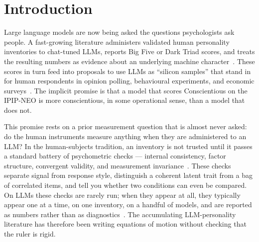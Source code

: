 
\section{Introduction}
\label{sec:intro}

Large language models are now being asked the questions psychologists ask people. A fast-growing literature administers validated human personality inventories to chat-tuned LLMs, reports Big Five or Dark Triad scores, and treats the resulting numbers as evidence about an underlying machine character~\citep{miotto2023gpt3,serapio2025psychometric,jiang2023personallm,huang2023psychobench,bodroza2024personality}. These scores in turn feed into proposals to use LLMs as ``silicon samples'' that stand in for human respondents in opinion polling, behavioural experiments, and economic surveys~\citep{argyle2023one,horton2023homo,aher2023using,park2023generative}. The implicit promise is that a model that scores Conscientious on the IPIP-NEO is more conscientious, in some operational sense, than a model that does not.

This promise rests on a prior measurement question that is almost never asked: do the human instruments measure anything when they are administered to an LLM? In the human-subjects tradition, an inventory is not trusted until it passes a standard battery of psychometric checks --- internal consistency, factor structure, convergent validity, and measurement invariance~\citep{cronbach1951coefficient,kaiser1960application,vandenberg2000review}. These checks separate signal from response style, distinguish a coherent latent trait from a bag of correlated items, and tell you whether two conditions can even be compared. On LLMs these checks are rarely run; when they appear at all, they typically appear one at a time, on one inventory, on a handful of models, and are reported as numbers rather than as diagnostics~\citep{suhr2025challenging,pelet2025persistent,schaekermann2024personality}. The accumulating LLM-personality literature has therefore been writing equations of motion without checking that the ruler is rigid.

